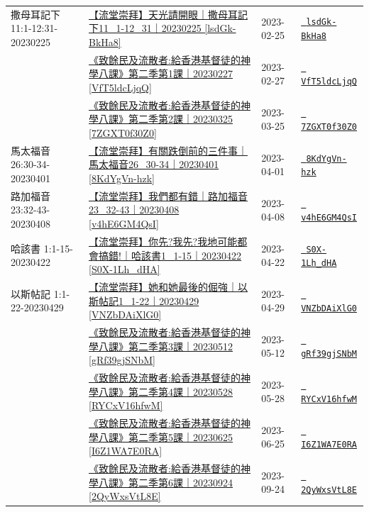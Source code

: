 \documentclass{book}
\begin{document}
{\begin{xltabular}{\textwidth}{|p{0.15\textwidth} p{0.6\textwidth}|p{0.07\textwidth} p{0.1\textwidth}|}
撒母耳記下 11:1-12:31-20230225 & \hyperref[sec:lsdGk_BkHa8]{【流堂崇拜】天光請開眼｜撒母耳記下11\_1-12\_31｜20230225 [lsdGk-BkHa8]} & 2023-02-25 & \href{https://youtube.com/watch?v=lsdGk-BkHa8}{\texttt{ lsdGk-BkHa8}} \\
    & \hyperref[sec:VfT5ldcLjqQ]{《致餘民及流散者:給香港基督徒的神學八課》第二季第1課｜20230227 [VfT5ldcLjqQ]} & 2023-02-27 & \href{https://youtube.com/watch?v=VfT5ldcLjqQ}{\texttt{ VfT5ldcLjqQ}} \\
    & \hyperref[sec:7ZGXT0f30Z0]{《致餘民及流散者:給香港基督徒的神學八課》第二季第2課｜20230325 [7ZGXT0f30Z0]} & 2023-03-25 & \href{https://youtube.com/watch?v=7ZGXT0f30Z0}{\texttt{ 7ZGXT0f30Z0}} \\
馬太福音 26:30-34-20230401 & \hyperref[sec:8KdYgVn_hzk]{【流堂崇拜】有關跌倒前的三件事｜馬太福音26\_30-34｜20230401 [8KdYgVn-hzk]} & 2023-04-01 & \href{https://youtube.com/watch?v=8KdYgVn-hzk}{\texttt{ 8KdYgVn-hzk}} \\
路加福音 23:32-43-20230408 & \hyperref[sec:v4hE6GM4QsI]{【流堂崇拜】我們都有錯｜路加福音23\_32-43｜20230408 [v4hE6GM4QsI]} & 2023-04-08 & \href{https://youtube.com/watch?v=v4hE6GM4QsI}{\texttt{ v4hE6GM4QsI}} \\
哈該書 1:1-15-20230422 & \hyperref[sec:S0X_1Lh_dHA]{【流堂崇拜】你先?我先?我地可能都會搞錯!｜哈該書1\_1-15｜20230422 [S0X-1Lh\_dHA]} & 2023-04-22 & \href{https://youtube.com/watch?v=S0X-1Lh_dHA}{\texttt{ S0X-1Lh\_dHA}} \\
以斯帖記 1:1-22-20230429 & \hyperref[sec:VNZbDAiXlG0]{【流堂崇拜】她和她最後的倔強｜以斯帖記1\_1-22｜20230429 [VNZbDAiXlG0]} & 2023-04-29 & \href{https://youtube.com/watch?v=VNZbDAiXlG0}{\texttt{ VNZbDAiXlG0}} \\
    & \hyperref[sec:gRf39gjSNbM]{《致餘民及流散者:給香港基督徒的神學八課》第二季第3課｜20230512 [gRf39gjSNbM]} & 2023-05-12 & \href{https://youtube.com/watch?v=gRf39gjSNbM}{\texttt{ gRf39gjSNbM}} \\
    & \hyperref[sec:RYCxV16hfwM]{《致餘民及流散者:給香港基督徒的神學八課》第二季第4課｜20230528 [RYCxV16hfwM]} & 2023-05-28 & \href{https://youtube.com/watch?v=RYCxV16hfwM}{\texttt{ RYCxV16hfwM}} \\
    & \hyperref[sec:I6Z1WA7E0RA]{《致餘民及流散者:給香港基督徒的神學八課》第二季第5課｜20230625 [I6Z1WA7E0RA]} & 2023-06-25 & \href{https://youtube.com/watch?v=I6Z1WA7E0RA}{\texttt{ I6Z1WA7E0RA}} \\
    & \hyperref[sec:2QyWxsVtL8E]{《致餘民及流散者:給香港基督徒的神學八課》第二季第6課｜20230924 [2QyWxsVtL8E]} & 2023-09-24 & \href{https://youtube.com/watch?v=2QyWxsVtL8E}{\texttt{ 2QyWxsVtL8E}} \\

\end{xltabular}}
\end{document}
